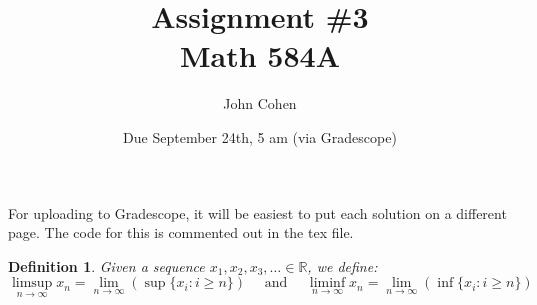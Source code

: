 \documentclass[11pt,letterpaper]{article}
\title{Assignment \#3\\Math 584A}
\author{
	John Cohen
	}
\date{Due September 24th, 5 am (via Gradescope)}
\newcommand{\R}{\mathbb{R}}
\newtheorem{defn}{Definition}
\newenvironment{prob}[1]
  {\renewcommand\theinnerprob{#1}\innerprob}
  {\endinnerprob}
\begin{document}
\maketitle

For uploading to Gradescope, it will be easiest to put each solution on a different page.  The code for this is commented out in the tex file.






\begin{defn}
	Given a sequence $x_1, x_2, x_3, \dots \in \R$, we define:
	\[
		\limsup_{n\to\infty} x_n
			= \lim_{n\to\infty} \left( \sup\{ x_i : i \geq n\}\right)
		\quad\text{ and }\quad
		\liminf_{n\to\infty} x_n
			= \lim_{n\to\infty} \left( \inf\{ x_i : i \geq n\}\right)
	\]
\end{defn}
\end{document}
